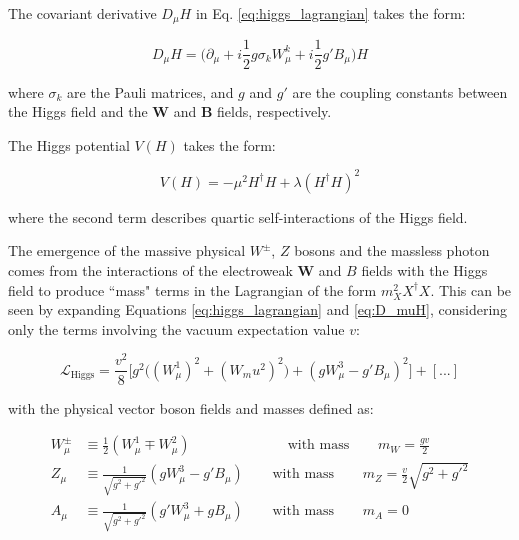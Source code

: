 The covariant derivative \(D_\mu H\) in Eq. \ref{eq:higgs_lagrangian} takes the form:

\begin{equation}
\label{eq:D_muH}
D_\mu H = \big(\partial_\mu + i\frac{1}{2}g\sigma_k W^k_\mu+i\frac{1}{2}g'B_\mu\big)H
\end{equation}

\noindent where \(\sigma_k\) are the Pauli matrices, and \(g\) and \(g'\) are the coupling constants between the Higgs field and the \(\boldsymbol{W}\) and \(\boldsymbol{B}\) fields, respectively.

The Higgs potential \(V(H)\) takes the form:

\begin{equation}
V(H) = -\mu^2H^\dagger H + \lambda(H^\dagger H)^2
\end{equation}

\noindent where the second term describes quartic self-interactions of the Higgs field.

The emergence of the massive physical \(W^\pm\), \(Z\) bosons and the massless photon comes from the interactions of the electroweak \(\boldsymbol{W}\) and \(B\) fields with the Higgs field to produce ``mass" terms in the Lagrangian of the form \(m_X^2X^\dagger X\). This can be seen by expanding Equations \ref{eq:higgs_lagrangian} and  \ref{eq:D_muH}, considering only the terms involving the vacuum expectation value \(v\):

\begin{equation}
\label{eq:higgs_expanded}
\mathcal{L}_\text{Higgs} = \frac{v^2}{8}\Big[g^2\big((W^1_\mu)^2+(W_mu^2)^2\big) + (gW^3_\mu-g'B_\mu)^2\Big] + [...]
\end{equation}

\noindent with the physical vector boson fields and masses defined as:

\begin{equation}
\label{eq:physical_v_bosons}
\begin{split}
W^\pm_\mu & \equiv \frac{1}{2}(W_\mu^1 \mp W_\mu^2) \phantom{xxxxxxxxxlxx}\text{ with mass }\phantom{xxx} m_W=\frac{gv}{2} \\
Z_\mu & \equiv \frac{1}{\sqrt{g^2+g'^2}}(gW_\mu^3-g'B_\mu) \phantom{xxx}\text{ with mass }\phantom{xxx} m_Z = \frac{v}{2}\sqrt{g^2+g'^2} \\
A_\mu & \equiv \frac{1}{\sqrt{g^2+g'^2}}(g'W^3_\mu+gB_\mu) \phantom{xxx}\text{ with mass }\phantom{xxx} m_A = 0
\end{split}
\end{equation}

